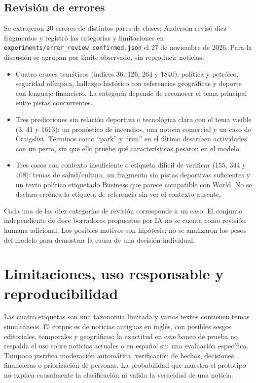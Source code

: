 \documentclass[conference]{IEEEtran}
\begin{document}
\subsection{Revisión de errores}
Se extrajeron 20 errores de distintos pares de clases; Anderson
revisó diez fragmentos y registró las categorías y limitaciones
en \texttt{experiments/error\_review\_confirmed.json} el 27 de
noviembre de 2026. Para la discusión se agrupan por límite
observado, sin reproducir noticias:
\begin{itemize}
\item Cuatro cruces temáticos (índices 36, 126, 264 y 1840):
 política y petróleo, seguridad olímpica, hallazgo histórico con
 referencias geográficas y deporte con lenguaje financiero. La
 categoría depende de reconocer el tema principal entre pistas
 concurrentes.
\item Tres predicciones sin relación deportiva o tecnológica clara
 con el tema visible (3, 41 y 1613): un pronóstico de incendios,
 una noticia comercial y un caso de Craigslist. Términos como
 ``park'' y ``run'' en el último describen actividades con un
 perro, sin que ello pruebe qué características pesaron en el modelo.
\item Tres casos con contexto insuficiente o etiqueta difícil
 de verificar (155, 344 y 408): temas de salud/cultura, un
 fragmento sin pistas deportivas suficientes y un texto político
 etiquetado Business que parece compatible con World. No se
 declara errónea la etiqueta de referencia sin ver el contexto
 ausente.
\end{itemize}
Cada una de las diez categorías de revisión corresponde a un caso.
El conjunto independiente de doce borradores propuestos por IA
no se cuenta como revisión humana adicional. Los posibles motivos
son hipótesis: no se analizaron los pesos del modelo para demostrar
la causa de una decisión individual.

\section{Limitaciones, uso responsable y reproducibilidad}
Las cuatro etiquetas son una taxonomía limitada y varios textos
contienen temas simultáneos. El corpus es de noticias antiguas
en inglés, con posibles sesgos editoriales, temporales y
geográficos; la exactitud en este banco de prueba no respalda
el uso sobre noticias actuales o en español sin una evaluación
específica. Tampoco justifica moderación automática, verificación
de hechos, decisiones financieras o priorización de personas.
La probabilidad que muestra el prototipo no explica causalmente
la clasificación ni valida la veracidad de una noticia.
\end{document}
